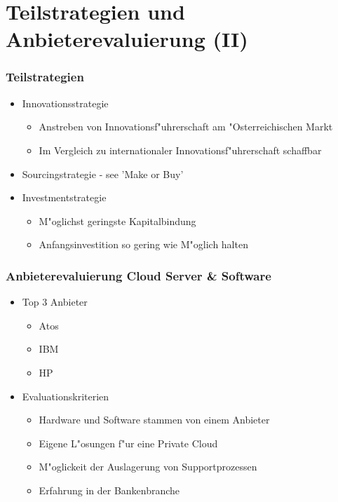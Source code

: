 \documentclass{beamer}
\begin{document}
\section{Teilstrategien und Anbieterevaluierung (II)}

\begin{frame}[plain]
  \frametitle{Teilstrategien}
  \begin{itemize}

	\item Innovationsstrategie
		\begin{itemize}
			\item Anstreben von Innovationsf"uhrerschaft am "Osterreichischen Markt
			\item Im Vergleich zu internationaler Innovationsf"uhrerschaft schaffbar\vspace{2mm}
		\end{itemize}
	\item Sourcingstrategie - see 'Make or Buy'\vspace{2mm}
	\item Investmentstrategie
		\begin{itemize}
			\item M"oglichst geringste Kapitalbindung
			\item Anfangsinvestition so gering wie M"oglich halten 
		\end{itemize}			
	
  \end{itemize}
\end{frame}

\begin{frame}[plain]
  \frametitle{Anbieterevaluierung Cloud Server \& Software}
  \begin{itemize}

	\item Top 3 Anbieter
		\begin{itemize}
			\item Atos
			\item IBM
			\item HP\vspace{2mm}
		\end{itemize}
	
	\item Evaluationskriterien
		\begin{itemize}
			\item Hardware und Software stammen von einem Anbieter 
			\item Eigene L"osungen f"ur eine Private Cloud
			\item M"oglickeit der Auslagerung von Supportprozessen
			\item Erfahrung in der Bankenbranche
		\end{itemize}	

  \end{itemize}
\end{frame}
\end{document}
